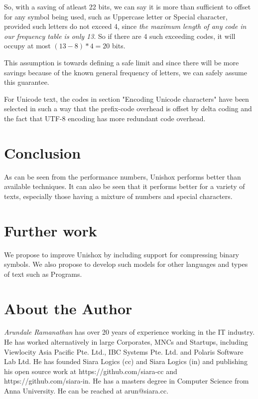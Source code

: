 \documentclass[]{article}
\begin{document}
So, with a saving of atleast 22 bits, we can say it is more than sufficient to offset for any symbol being used, such as Uppercase letter or Special character, provided such letters do not exceed 4, since \emph{the maximum length of any code in our frequency table is only 13}.  So if there are 4 such exceeding codes, it will occupy at most $(13 - 8) * 4 = 20$ bits.

This assumption is towards defining a safe limit and since there will be more savings because of the known general frequency of letters, we can safely assume this guarantee.

For Unicode text, the codes in section "Encoding Unicode characters" have been selected in such a way that the prefix-code overhead is offset by delta coding and the fact that UTF-8 encoding has more redundant code overhead.

\section{Conclusion}

As can be seen from the performance numbers, Unishox performs better than available techniques.  It can also be seen that it performs better for a variety of texts, especially those having a mixture of numbers and special characters.

\section{Further work}

We propose to improve Unishox by including support for compressing binary symbols.  We also propose to develop such models for other languages and types of text such as Programs.

\section{About the Author}

\emph{Arundale Ramanathan} has over 20 years of experience working in the IT industry.  He has worked alternatively in large Corporates, MNCs and Startups, including Viewlocity Asia Pacific Pte. Ltd., IBC Systems Pte. Ltd. and Polaris Software Lab Ltd. He has founded Siara Logics (cc) and Siara Logics (in) and publishing his open source work at https://github.com/siara-cc and https://github.com/siara-in. He has a masters degree in Computer Science from Anna University.  He can be reached at arun@siara.cc.
\end{document}

